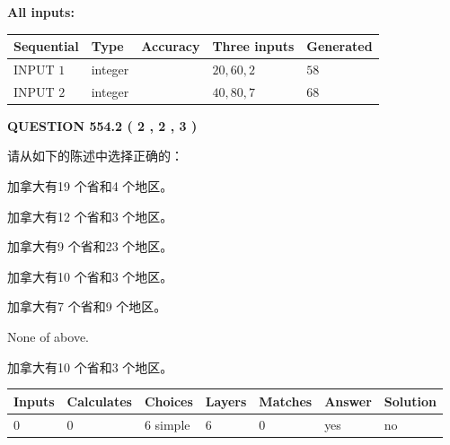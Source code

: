 \documentclass{ctexart}
\begin{document}
   
   
   
\noindent\vspace{0.1in}\hspace{-0.08in} {\textbf{\Large{All inputs: }}}
   
   
  
  
\noindent\begin{tabular}{|l|l|l|l|l|}
\hline
 Sequential & Type & Accuracy & Three inputs & Generated \\ 
\hline
 
 
  INPUT $  1 $ & integer &  & $
 20
 , 
 60
 , 
 2
 $ & $ 58 $ 
 \\  \hline  
 
 
  INPUT $  2 $ & integer &  & $
 40
 , 
 80
 , 
 7
 $ & $ 68 $ 
 \\  \hline  
 \end{tabular}
   
   
  
\vspace{0.2in}
  
{\textbf{\Large{QUESTION
554.2 
 ( 2 , 2 , 3 )
}}}
  
  
请从如下的陈述中选择正确的：
 
 
加拿大有19 个省和4 个地区。
 
 
加拿大有12 个省和3 个地区。
 
 
加拿大有9 个省和23 个地区。
 
 
加拿大有10 个省和3 个地区。
 
 
加拿大有7 个省和9 个地区。
 
 
 None of above.
 
 
\noindent{}
 
 
加拿大有10 个省和3 个地区。
 
 
\noindent{}
 
 
   
   
   
   
\noindent\begin{tabular}{|l|l|l|l|l|l|l|}
 \hline
Inputs & Calculates & Choices & Layers & Matches & Answer & Solution \\ \hline
 0  & 
 0  & 
 6
  simple  
  & 
 6  & 
 0  & 
  yes & 
  no 
  \\ \hline
 \end{tabular}
   
\end{document}
